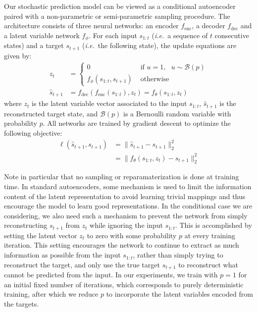 \documentclass{article}
\begin{document}
Our stochastic prediction model can be viewed as a conditional autoencoder paired with a non-parametric  or semi-parametric sampling procedure.
The architecture consists of three neural networks: an encoder $f_\text{enc}$, a decoder $f_\text{dec}$ and a latent variable network $f_\phi$.
For each input $s_{1:t}$ (\emph{i.e.}\ a sequence of $t$ consecutive states) and a target $s_{t+1}$ (\emph{i.e.}\ the following state), the update equations are given by:
%
\begin{align}
  \label{update-eqn}
  z_t &=
  \begin{cases}
    0 & \mbox{   if   } u = 1, \mbox{   } u \sim \mathcal{B}(p) \\
    f_\phi(s_{1:t}, s_{t+1}) & \mbox{   otherwise}
  \end{cases} \\
  \hat{s}_{t+1} &= f_\text{dec}(f_\text{enc}(s_{1:t}), z_t) = f_\theta(s_{1:t}, z_t)
\end{align}
%
where $z_t$ is the latent variable vector associated to the input $s_{1:t}$, $\hat{s}_{t + 1}$ is the reconstructed target state, and $\mathcal{B}(p)$ is a Bernoulli random variable with probability $p$.
All networks are trained by gradient descent to optimize the following objective:
%
\begin{align}
  \ell(\hat{s}_{t+1}, s_{t+1}) &= \lVert \hat{s}_{t+1} - s_{t+1} \rVert_2^2 \\
  &= \lVert f_\theta(s_{1:t}, z_t) - s_{t+1} \rVert_2^2
\end{align}

Note in particular that no sampling or reparamaterization is done at training time.
In standard autoencoders, some mechanism is used to limit the information content of the latent representation to avoid learning trivial mappings and thus encourage the model to learn good representations.
In the conditional case we are considering, we also need such a mechanism to prevent the network from simply reconstructing $s_{t+1}$ from $z_t$ while ignoring the input $s_{1:t}$.
This is accomplished by setting the latent vector $z_t$ to zero with some probability $p$ at every training iteration.
This setting encourages the network to continue to extract as much information as possible from the input $s_{1:t}$, rather than simply trying to reconstruct the target, and only use the true target $s_{t+1}$ to reconstruct what cannot be predicted from the input.
In our experiments, we train with $p=1$ for an initial fixed number of iterations, which corresponds to purely deterministic training, after which we reduce $p$ to incorporate the latent variables encoded from the targets.
\end{document}
